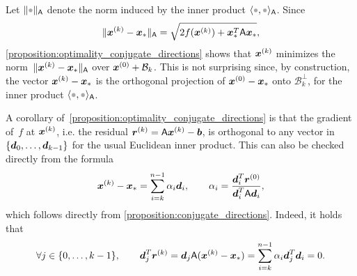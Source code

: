 \begin{remark}
    Let $\norm{\placeholder}_{\mat A}$ denote the norm induced by the inner product $\ip{\placeholder,\placeholder}_{\mat A}$.
    Since
    \[
        \lVert\mathbf{\boldsymbol{x}}^{(k)} - \mathbf{\boldsymbol{x}}_*\rVert_{\mathsf A} = \sqrt{2f(\mathbf{\boldsymbol{x}}^{(k)}) + \mathbf{\boldsymbol{x}}_*^T \mathsf A \mathbf{\boldsymbol{x}}_*},
    \]
    \cref{proposition:optimality_conjugate_directions} shows that $\mathbf{\boldsymbol{x}}^{(k)}$ minimizes the norm~$\lVert\mathbf{\boldsymbol{x}}^{(k)} - \mathbf{\boldsymbol{x}}_*\rVert_{\mathsf A}$
    over $\mathbf{\boldsymbol{x}}^{(0)} + \mathcal  B_k$.
    This is not surprising since,
    by construction, the vector $\mathbf{\boldsymbol{x}}^{(k)} - \mathbf{\boldsymbol{x}}_*$ is the orthogonal projection
    of $\mathbf{\boldsymbol{x}}^{(0)} - \mathbf{\boldsymbol{x}}_*$ onto $\mathcal B_k^\perp$,
    for the inner product $\ip{\placeholder,\placeholder}_{\mat A}$.
\end{remark}

A corollary of~\eqref{proposition:optimality_conjugate_directions} is that the gradient of~$f$ at $\mathbf{\boldsymbol{x}}^{(k)}$,
i.e. the residual $\mathbf{\boldsymbol{r}}^{(k)} = \mathsf A \mathbf{\boldsymbol{x}}^{(k)} - \mathbf{\boldsymbol{b}}$,
is orthogonal to any vector in $\{\mathbf{\boldsymbol{d}}_0, \dotsc, \mathbf{\boldsymbol{d}}_{k-1} \}$ for the usual Euclidean inner product.
This can also be checked directly from the formula
\[
    \mathbf{\boldsymbol{x}}^{(k)} - \mathbf{\boldsymbol{x}}_* = \sum_{i=k}^{n-1} \alpha_i \mathbf{\boldsymbol{d}}_i,
    \qquad \alpha_i = \frac{\mathbf{\boldsymbol{d}}_i^T \mathbf{\boldsymbol{r}}^{(0)}}{\mathbf{\boldsymbol{d}}_i^T \mathsf A \mathbf{\boldsymbol{d}}_i},
\]
which follows directly from \cref{proposition:conjugate_directions}.
Indeed, it holds that
\begin{equation}
    \label{eq:orthogonality_residual}
    \forall j \in \{0, \dotsc, k-1\}, \qquad
    \mathbf{\boldsymbol{d}}_j^T \mathbf{\boldsymbol{r}}^{(k)} = \mathbf{\boldsymbol{d}}_j \mathsf A (\mathbf{\boldsymbol{x}}^{(k)} - \mathbf{\boldsymbol{x}}_*)
    = \sum_{i=k}^{n-1} \alpha_i \mathbf{\boldsymbol{d}}_j^T \mathbf{\boldsymbol{d}}_i = 0.
\end{equation}

